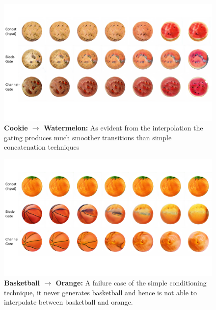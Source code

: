 \documentclass[10pt,twocolumn,letterpaper]{article}
\begin{document}
\begin{figure}[t]
    \centering
    \includegraphics[width=\linewidth]{interpolation-watermelon-cookie.pdf}
    \caption{{\bf Cookie $\rightarrow$ Watermelon:} As evident from the interpolation the gating produces much smoother transitions than simple concatenation techniques }
    \label{fig:inter_watermelon_cookie}
    \vspace{-3mm}
\end{figure}


\begin{figure}[t]
    \centering
    \includegraphics[width=\linewidth]{interpolation-orange-basketball.pdf}
    \caption{ {\bf Basketball $\rightarrow$ Orange:} A failure case of the simple conditioning technique, it never generates basketball and hence is not able to interpolate between basketball and orange. }
    \label{fig:inter_orange_basketball}
    \vspace{-3mm}
\end{figure}
\end{document}
